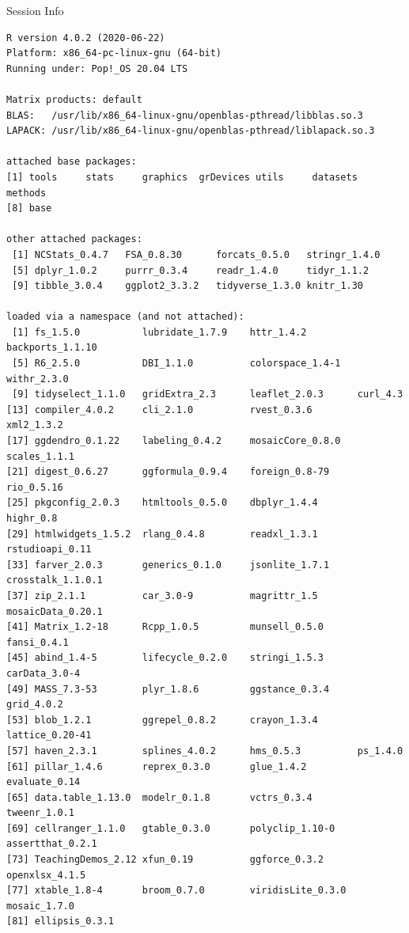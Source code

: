\documentclass[10pt]{beamer}\usepackage[]{graphicx}\usepackage[]{color}
\makeatletter
\newenvironment{kframe}{%
 \def\at@end@of@kframe{}%
 \ifinner\ifhmode%
  \def\at@end@of@kframe{\end{minipage}}%
  \begin{minipage}{\columnwidth}%
 \fi\fi%
 \def\FrameCommand##1{\hskip\@totalleftmargin \hskip-\fboxsep
 \colorbox{shadecolor}{##1}\hskip-\fboxsep
     \hskip-\linewidth \hskip-\@totalleftmargin \hskip\columnwidth}%
 \MakeFramed {\advance\hsize-\width
   \@totalleftmargin\z@ \linewidth\hsize
   \@setminipage}}%
 {\par\unskip\endMakeFramed%
 \at@end@of@kframe}
\newenvironment{knitrout}{}{} %
\makeatother
\begin{document}
\begin{frame}[fragile]{Session Info}
	\tiny
	
\begin{knitrout}\tiny
{}\color{fgcolor}\begin{kframe}
\begin{verbatim}
R version 4.0.2 (2020-06-22)
Platform: x86_64-pc-linux-gnu (64-bit)
Running under: Pop!_OS 20.04 LTS

Matrix products: default
BLAS:   /usr/lib/x86_64-linux-gnu/openblas-pthread/libblas.so.3
LAPACK: /usr/lib/x86_64-linux-gnu/openblas-pthread/liblapack.so.3

attached base packages:
[1] tools     stats     graphics  grDevices utils     datasets  methods  
[8] base     

other attached packages:
 [1] NCStats_0.4.7   FSA_0.8.30      forcats_0.5.0   stringr_1.4.0  
 [5] dplyr_1.0.2     purrr_0.3.4     readr_1.4.0     tidyr_1.1.2    
 [9] tibble_3.0.4    ggplot2_3.3.2   tidyverse_1.3.0 knitr_1.30     

loaded via a namespace (and not attached):
 [1] fs_1.5.0           lubridate_1.7.9    httr_1.4.2         backports_1.1.10  
 [5] R6_2.5.0           DBI_1.1.0          colorspace_1.4-1   withr_2.3.0       
 [9] tidyselect_1.1.0   gridExtra_2.3      leaflet_2.0.3      curl_4.3          
[13] compiler_4.0.2     cli_2.1.0          rvest_0.3.6        xml2_1.3.2        
[17] ggdendro_0.1.22    labeling_0.4.2     mosaicCore_0.8.0   scales_1.1.1      
[21] digest_0.6.27      ggformula_0.9.4    foreign_0.8-79     rio_0.5.16        
[25] pkgconfig_2.0.3    htmltools_0.5.0    dbplyr_1.4.4       highr_0.8         
[29] htmlwidgets_1.5.2  rlang_0.4.8        readxl_1.3.1       rstudioapi_0.11   
[33] farver_2.0.3       generics_0.1.0     jsonlite_1.7.1     crosstalk_1.1.0.1 
[37] zip_2.1.1          car_3.0-9          magrittr_1.5       mosaicData_0.20.1 
[41] Matrix_1.2-18      Rcpp_1.0.5         munsell_0.5.0      fansi_0.4.1       
[45] abind_1.4-5        lifecycle_0.2.0    stringi_1.5.3      carData_3.0-4     
[49] MASS_7.3-53        plyr_1.8.6         ggstance_0.3.4     grid_4.0.2        
[53] blob_1.2.1         ggrepel_0.8.2      crayon_1.3.4       lattice_0.20-41   
[57] haven_2.3.1        splines_4.0.2      hms_0.5.3          ps_1.4.0          
[61] pillar_1.4.6       reprex_0.3.0       glue_1.4.2         evaluate_0.14     
[65] data.table_1.13.0  modelr_0.1.8       vctrs_0.3.4        tweenr_1.0.1      
[69] cellranger_1.1.0   gtable_0.3.0       polyclip_1.10-0    assertthat_0.2.1  
[73] TeachingDemos_2.12 xfun_0.19          ggforce_0.3.2      openxlsx_4.1.5    
[77] xtable_1.8-4       broom_0.7.0        viridisLite_0.3.0  mosaic_1.7.0      
[81] ellipsis_0.3.1    
\end{verbatim}
\end{kframe}
\end{knitrout}
	
\end{frame}
\end{document}
